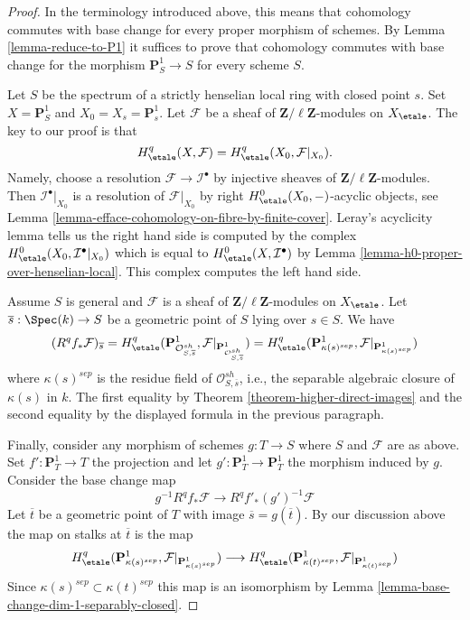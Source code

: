 \begin{proof}
In the terminology introduced above, this means that cohomology commutes
with base change for every proper morphism of schemes. By
Lemma \ref{lemma-reduce-to-P1}
it suffices to prove that cohomology commutes with base change
for the morphism $\mathbf{P}^1_S \to S$ for every scheme $S$.

\medskip\noindent
Let $S$ be the spectrum of a strictly henselian local ring with closed
point $s$. Set $X = \mathbf{P}^1_S$ and $X_0 = X_s = \mathbf{P}^1_s$.
Let $\mathcal{F}$ be a sheaf of $\mathbf{Z}/\ell\mathbf{Z}$-modules
on $X_\etale$. The key to our proof is that
$$
H^q_\etale(X, \mathcal{F}) = H^q_\etale(X_0, \mathcal{F}|_{X_0}).
$$
Namely, choose a resolution $\mathcal{F} \to \mathcal{I}^\bullet$
by injective sheaves of $\mathbf{Z}/\ell\mathbf{Z}$-modules.
Then $\mathcal{I}^\bullet|_{X_0}$ is a resolution of $\mathcal{F}|_{X_0}$
by right $H^0_\etale(X_0, -)$-acyclic objects, see
Lemma \ref{lemma-efface-cohomology-on-fibre-by-finite-cover}.
Leray's acyclicity lemma tells us the right hand side is computed by
the complex $H^0_\etale(X_0, \mathcal{I}^\bullet|_{X_0})$
which is equal to $H^0_\etale(X, \mathcal{I}^\bullet)$ by
Lemma \ref{lemma-h0-proper-over-henselian-local}. This complex
computes the left hand side.

\medskip\noindent
Assume $S$ is general and $\mathcal{F}$ is a sheaf of
$\mathbf{Z}/\ell\mathbf{Z}$-modules on $X_\etale$.
Let $\overline{s} : \Spec(k) \to S$ be a geometric point
of $S$ lying over $s \in S$. We have
$$
(R^qf_*\mathcal{F})_{\overline{s}} =
H^q_\etale(\mathbf{P}^1_{\mathcal{O}_{S, \overline{s}}^{sh}},
\mathcal{F}|_{\mathbf{P}^1_{\mathcal{O}_{S, \overline{s}}^{sh}}}) =
H^q_\etale(\mathbf{P}^1_{\kappa(s)^{sep}},
\mathcal{F}|_{\mathbf{P}^1_{\kappa(s)^{sep}}})
$$
where $\kappa(s)^{sep}$ is the residue field of
$\mathcal{O}_{S, \overline{s}}^{sh}$, i.e., the separable algebraic
closure of $\kappa(s)$ in $k$.
The first equality by Theorem \ref{theorem-higher-direct-images}
and the second equality by the displayed formula in the
previous paragraph.

\medskip\noindent
Finally, consider any morphism of schemes $g : T \to S$ where
$S$ and $\mathcal{F}$ are as above.
Set $f' : \mathbf{P}^1_T \to T$ the projection and let
$g' : \mathbf{P}^1_T \to \mathbf{P}^1_T$ the morphism induced
by $g$. Consider the base change map
$$
g^{-1}R^qf_*\mathcal{F}
\longrightarrow
R^qf'_*(g')^{-1}\mathcal{F}
$$
Let $\overline{t}$ be a geometric point of $T$ with image
$\overline{s} = g(\overline{t})$. By our discussion
above the map on stalks at $\overline{t}$ is the map
$$
H^q_\etale(\mathbf{P}^1_{\kappa(s)^{sep}},
\mathcal{F}|_{\mathbf{P}^1_{\kappa(s)^{sep}}})
\longrightarrow
H^q_\etale(\mathbf{P}^1_{\kappa(t)^{sep}},
\mathcal{F}|_{\mathbf{P}^1_{\kappa(t)^{sep}}})
$$
Since $\kappa(s)^{sep} \subset \kappa(t)^{sep}$ this map is an
isomorphism by Lemma \ref{lemma-base-change-dim-1-separably-closed}.


\end{proof}
